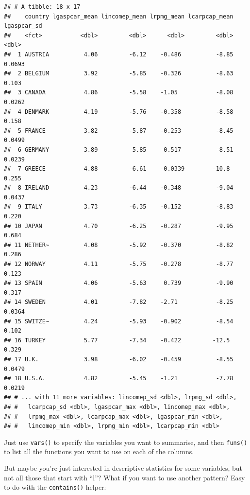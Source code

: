 \documentclass[]{gitbook}
\newenvironment{Shaded}{\begin{snugshade}}{\end{snugshade}}
\newcommand{\KeywordTok}[1]{\textcolor[rgb]{0.13,0.29,0.53}{\textbf{#1}}}
\newcommand{\NormalTok}[1]{#1}
\newcommand{\OperatorTok}[1]{\textcolor[rgb]{0.81,0.36,0.00}{\textbf{#1}}}
\newcommand{\StringTok}[1]{\textcolor[rgb]{0.31,0.60,0.02}{#1}}
\begin{document}
\begin{verbatim}
## # A tibble: 18 x 17
##    country lgaspcar_mean lincomep_mean lrpmg_mean lcarpcap_mean lgaspcar_sd
##    <fct>           <dbl>         <dbl>      <dbl>         <dbl>       <dbl>
##  1 AUSTRIA          4.06         -6.12    -0.486          -8.85      0.0693
##  2 BELGIUM          3.92         -5.85    -0.326          -8.63      0.103 
##  3 CANADA           4.86         -5.58    -1.05           -8.08      0.0262
##  4 DENMARK          4.19         -5.76    -0.358          -8.58      0.158 
##  5 FRANCE           3.82         -5.87    -0.253          -8.45      0.0499
##  6 GERMANY          3.89         -5.85    -0.517          -8.51      0.0239
##  7 GREECE           4.88         -6.61    -0.0339        -10.8       0.255 
##  8 IRELAND          4.23         -6.44    -0.348          -9.04      0.0437
##  9 ITALY            3.73         -6.35    -0.152          -8.83      0.220 
## 10 JAPAN            4.70         -6.25    -0.287          -9.95      0.684 
## 11 NETHER~          4.08         -5.92    -0.370          -8.82      0.286 
## 12 NORWAY           4.11         -5.75    -0.278          -8.77      0.123 
## 13 SPAIN            4.06         -5.63     0.739          -9.90      0.317 
## 14 SWEDEN           4.01         -7.82    -2.71           -8.25      0.0364
## 15 SWITZE~          4.24         -5.93    -0.902          -8.54      0.102 
## 16 TURKEY           5.77         -7.34    -0.422         -12.5       0.329 
## 17 U.K.             3.98         -6.02    -0.459          -8.55      0.0479
## 18 U.S.A.           4.82         -5.45    -1.21           -7.78      0.0219
## # ... with 11 more variables: lincomep_sd <dbl>, lrpmg_sd <dbl>,
## #   lcarpcap_sd <dbl>, lgaspcar_max <dbl>, lincomep_max <dbl>,
## #   lrpmg_max <dbl>, lcarpcap_max <dbl>, lgaspcar_min <dbl>,
## #   lincomep_min <dbl>, lrpmg_min <dbl>, lcarpcap_min <dbl>
\end{verbatim}

Just use \texttt{vars()} to specify the variables you want to summarise, and then \texttt{funs()} to list all the
functions you want to use on each of the columns.

But maybe you're just interested in descriptive statistics for some variables, but not all those
that start with ``l''? What if you want to use another pattern? Easy to do with the \texttt{contains()}
helper:

\begin{Shaded}
\end{Shaded}
\end{document}
